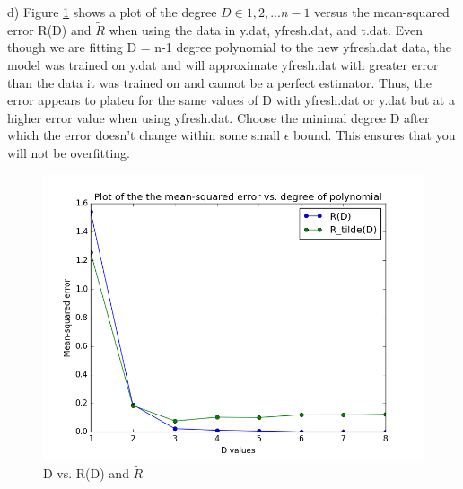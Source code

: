 \documentclass[11pt]{article}
\newenvironment{problem}[2][Problem]{\begin{trivlist}
\item[\hskip \labelsep {\bfseries #1}\hskip \labelsep {\bfseries #2.}]}{\end{trivlist}}
\begin{document}
\begin{problem}{2.1}
(d) Figure \ref{fig:2d} shows a plot of the degree $D \in {1,2,...n-1}$ versus the mean-squared error R(D) and $\tilde{R}$ when using the data in y.dat, yfresh.dat, and t.dat. Even though we are fitting D = n-1 degree polynomial to the new yfresh.dat data, the model was trained on y.dat and will approximate yfresh.dat with greater error than the data it was trained on and cannot be a perfect estimator. Thus, the error appears to plateu for the same values of D with yfresh.dat or y.dat but at a higher error value when using yfresh.dat. Choose the minimal degree D after which the error doesn't change within some small $\epsilon$ bound. This ensures that you will not be overfitting. 
\begin{figure}[h!]
  \centering
  \includegraphics[scale=0.5]{figs/2d.png}
  \caption{D vs. R(D) and $\tilde{R}$}
  \label{fig:2d}
\end{figure}


\end{problem}
\end{document}
